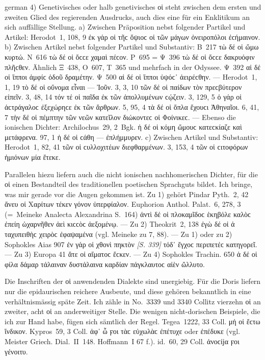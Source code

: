 \begin{otherlanguage*}{german}
4)	Genetivisches oder halb genetivisches οἱ steht zwischen dem ersten und zweiten Glied des regierenden Ausdrucks, auch dies eine für ein Enklitikum an sich auffällige Stellung. a) Zwischen Präposition nebst folgender Partikel und Artikel: Herodot~1, 108, 9 ἐκ γάρ οἱ τῆϲ ὄψιοϲ οἱ τῶν μάγων ὀνειροπόλοι ἐϲήμαινον. b) Zwischen Artikel nebst folgender Partikel und Substantiv: Β~217 τὼ δέ οἱ ὤμω κυρτώ. Ν~616 τὼ δέ οἱ ὄϲϲε χαμαὶ πέϲον. Ρ~695 = Ψ~396 τὼ δέ οἱ ὄϲϲε δακρυόφιν πλῆϲθεν. Ähnlich Ξ~438, Ο~607, Τ~365 und mehrfach in der Odyssee. Ψ~392 αἱ δέ οἱ ἵπποι ἀμφίϲ ὁδοῦ δραμέτην. Ψ~500 αἱ δέ οἱ ἵπποι ὑψόϲ᾽ ἀειρέϲθην. — Herodot~1, 1, 19 τὸ δέ οἱ οὔνομα εἶναι — Ἰοῦν. 3, 3, 10 τῶν δέ οἱ παίδων τὸν πρεϲβύτερον εἰπεῖν. 3, 48, 14 τόν τέ οἱ παῖδα ἐκ τῶν ἀπολλυμένων ϲῴζειν. 3, 129, 5 ὁ γάρ οἱ ἀϲτράγαλοϲ ἐξεχώρηϲε ἐκ τῶν ἄρθρων. 5, 95, 4 τὰ δέ οἱ ὅπλα ἔχουϲι Ἀθηναῖοι. 6, 41, 7 τὴν δέ οἱ πέμπτην τῶν νεῶν κατεῖλον διώκοντεϲ οἱ Φοίνικεϲ. — Ebenso die ionischen Dichter: Archilochus~29, 2~Bgk. ἡ δέ οἱ κόμη ὤμουϲ κατεϲκίαζε καὶ μετάφρενα. 97, 1 ἡ δέ οἱ ϲάθη — ἐπλήμμυρεν. c) Zwischen Artikel und Substantiv: Herodot~1, 82, 41 τῶν οἱ ϲυλλοχιτέων διεφθαρμένων. 3, 153, 4 τῶν οἱ ϲιτοφόρων ἡμιόνων μία ἔτεκε.

Parallelen hiezu liefern auch die nicht ionischen nachhomerischen Dichter, für die οἱ einen Bestandteil des traditionellen poetischen Sprachguts bildet. Ich bringe, was mir gerade vor die Augen gekommen ist. Zu 1) gehört Pindar Pyth.~2, 42 ἄνευ οἱ Χαρίτων τέκεν γόνον ὑπερφίαλον. Euphorion Anthol. Palat.~6, 278, 3 (=~Meineke Analecta Alexandrina S.~164) ἀντὶ δέ οἱ πλοκαμῖδοϲ ἑκηβόλε καλὸϲ ἐπείη ὡχαρνῆθεν ἀεὶ κιϲϲὸϲ ἀεξομένῳ. — Zu 2) Theokrit~2, 138 ἐγὼ δέ οἱ ἁ ταχυπειθὴϲ χειρὸϲ ἐφαψαμένα (vgl. Meineke zu 7, 88). — Zu 1) oder zu 2) Sophokles Aias 907 ἐν γάρ οἱ χθονὶ πηκτὸν \hypertarget{p339}{\emph{[S. 339]}}\label{p339} τόδ᾽ ἔγχοϲ περιπετέϲ κατηγορεῖ. — Zu 3) Europa 41 ἅτε οἱ αἵματοϲ ἔϲκεν. — Zu 4) Sophokles Trachin. 650 ἁ δέ οἱ φίλα δάμαρ τάλαιναν δυστάλαινα καρδίαν πάγκλαυτοϲ αἰὲν ὤλλυτο.

Die Inschriften der οἱ anwendenden Dialekte sind unergiebig. Für die Doris liefern nur die epidaurischen reichere Ausbeute, und diese gehören bekanntlich in eine verhältnismässig späte Zeit. Ich zähle in No.~3339 und 3340 Collitz vierzehn οἱ an zweiter, acht οἱ an anderweitiger Stelle. Die wenigen nicht-dorischen Beispiele, die ich zur Hand habe, fügen sich sämtlich der Regel. Tegea~1222, 33 Coll. μή οἱ ἔϲτω ἴνδικον. Kypros~59, 3 Coll. ἀφ᾽ ὧ ϝοι τὰϲ εὐχωλὰϲ ἐπέτυχε oder ἐπέδυκε (vgl. Meister Griech. Dial.~II~148. Hoffmann~I 67 f.). id.~60, 29 Coll. ἀνοϲίϳα ϝοι γένοιτυ.


\end{otherlanguage*}
